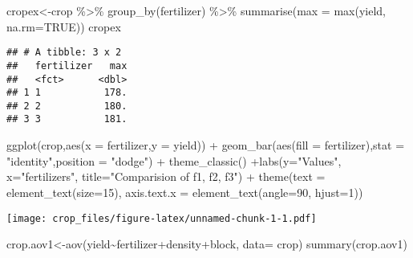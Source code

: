 \documentclass[
]{article}
\newenvironment{Shaded}{\begin{snugshade}}{\end{snugshade}}
\newcommand{\AttributeTok}[1]{\textcolor[rgb]{0.77,0.63,0.00}{#1}}
\newcommand{\ConstantTok}[1]{\textcolor[rgb]{0.00,0.00,0.00}{#1}}
\newcommand{\DecValTok}[1]{\textcolor[rgb]{0.00,0.00,0.81}{#1}}
\newcommand{\FunctionTok}[1]{\textcolor[rgb]{0.00,0.00,0.00}{#1}}
\newcommand{\NormalTok}[1]{#1}
\newcommand{\OtherTok}[1]{\textcolor[rgb]{0.56,0.35,0.01}{#1}}
\newcommand{\SpecialCharTok}[1]{\textcolor[rgb]{0.00,0.00,0.00}{#1}}
\newcommand{\StringTok}[1]{\textcolor[rgb]{0.31,0.60,0.02}{#1}}
\begin{document}
\begin{Shaded}
\begin{Highlighting}[]
\NormalTok{cropex}\OtherTok{\textless{}{-}}\NormalTok{crop }\SpecialCharTok{\%\textgreater{}\%} \FunctionTok{group\_by}\NormalTok{(fertilizer) }\SpecialCharTok{\%\textgreater{}\%} \FunctionTok{summarise}\NormalTok{(}\AttributeTok{max =} \FunctionTok{max}\NormalTok{(yield, }\AttributeTok{na.rm=}\ConstantTok{TRUE}\NormalTok{))}
\NormalTok{cropex   }
\end{Highlighting}
\end{Shaded}

\begin{verbatim}
## # A tibble: 3 x 2
##   fertilizer   max
##   <fct>      <dbl>
## 1 1           178.
## 2 2           180.
## 3 3           181.
\end{verbatim}

\begin{Shaded}
\begin{Highlighting}[]
\FunctionTok{ggplot}\NormalTok{(crop,}\FunctionTok{aes}\NormalTok{(}\AttributeTok{x =}\NormalTok{ fertilizer,}\AttributeTok{y =}\NormalTok{ yield)) }\SpecialCharTok{+} \FunctionTok{geom\_bar}\NormalTok{(}\FunctionTok{aes}\NormalTok{(}\AttributeTok{fill =}\NormalTok{ fertilizer),}\AttributeTok{stat =} \StringTok{"identity"}\NormalTok{,}\AttributeTok{position =} \StringTok{"dodge"}\NormalTok{) }\SpecialCharTok{+} \FunctionTok{theme\_classic}\NormalTok{() }\SpecialCharTok{+}\FunctionTok{labs}\NormalTok{(}\AttributeTok{y=}\StringTok{"Values"}\NormalTok{,  }\AttributeTok{x=}\StringTok{"fertilizers"}\NormalTok{, }\AttributeTok{title=}\StringTok{"Comparision of f1, f2, f3"}\NormalTok{) }\SpecialCharTok{+} \FunctionTok{theme}\NormalTok{(}\AttributeTok{text =} \FunctionTok{element\_text}\NormalTok{(}\AttributeTok{size=}\DecValTok{15}\NormalTok{),  }\AttributeTok{axis.text.x =} \FunctionTok{element\_text}\NormalTok{(}\AttributeTok{angle=}\DecValTok{90}\NormalTok{, }\AttributeTok{hjust=}\DecValTok{1}\NormalTok{))}
\end{Highlighting}
\end{Shaded}

\texttt{[image: crop\_files/figure-latex/unnamed-chunk-1-1.pdf]}

\begin{Shaded}
\begin{Highlighting}[]
\NormalTok{crop.aov1}\OtherTok{\textless{}{-}}\FunctionTok{aov}\NormalTok{(yield}\SpecialCharTok{\textasciitilde{}}\NormalTok{fertilizer}\SpecialCharTok{+}\NormalTok{density}\SpecialCharTok{+}\NormalTok{block, }\AttributeTok{data=}\NormalTok{ crop)}
\FunctionTok{summary}\NormalTok{(crop.aov1)}
\end{Highlighting}
\end{Shaded}
\end{document}
